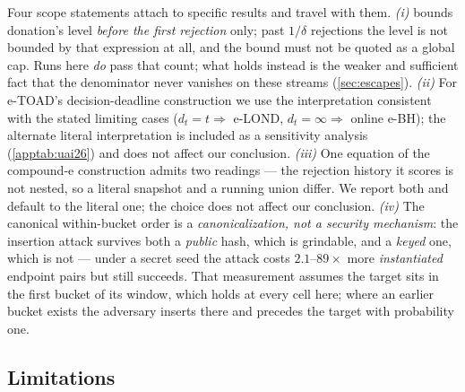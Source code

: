 \documentclass[conference]{IEEEtran}
\begin{document}
Four scope statements attach to specific results and travel with them.
\emph{(i)}  bounds donation's level \emph{before the first rejection} only; past
$1/\delta$ rejections the level is not bounded by that expression at all, and the bound must not be
quoted as a global cap. Runs here \emph{do} pass that count; what holds instead is the weaker
and sufficient fact that the denominator never vanishes on these streams (\cref{sec:escapes}).
\emph{(ii)} For e-TOAD's decision-deadline construction we use the interpretation consistent with the
stated limiting cases ($d_t = t \Rightarrow$ e-LOND, $d_t = \infty \Rightarrow$ online e-BH); the
alternate literal interpretation is included as a sensitivity analysis (\cref{apptab:uai26}) and does
not affect our conclusion.
\emph{(iii)} One equation of the compound-e construction admits two readings --- the rejection history it
scores is not nested, so a literal snapshot and a running union differ. We report both and default to the
literal one; the choice does not affect our conclusion.
\emph{(iv)} The canonical within-bucket order is a \emph{canonicalization, not a security mechanism}:
the insertion attack survives both a \emph{public} hash, which is grindable, and a \emph{keyed} one,
which is not --- under a secret seed the attack costs $2.1$--$89\times$ more \emph{instantiated}
endpoint pairs but still succeeds. That measurement assumes the target sits in the first bucket of its
window, which holds at every cell here; where an earlier bucket exists the adversary inserts there and
precedes the target with probability one.

\subsection{Limitations}\label{sec:limitations}
\end{document}

